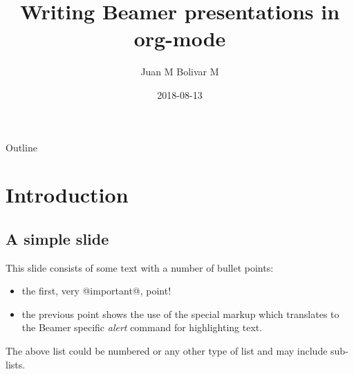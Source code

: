 \documentclass[bigger]{beamer}
\author{Juan M Bolivar M}
\date{2018-08-13}
\title{Writing Beamer presentations in org-mode}
\begin{document}
\maketitle
\begin{frame}{Outline}
\tableofcontents
\end{frame}



\section{Introduction}
\label{sec:orgbd61b08}
\subsection{A simple slide}
\label{sec:org747827a}
This slide consists of some text with a number of bullet points:

\begin{itemize}
\item the first, very @important@, point!
\item the previous point shows the use of the special markup which
translates to the Beamer specific \emph{alert} command for highlighting
text.
\end{itemize}


The above list could be numbered or any other type of list and may
include sub-lists.
\end{document}
